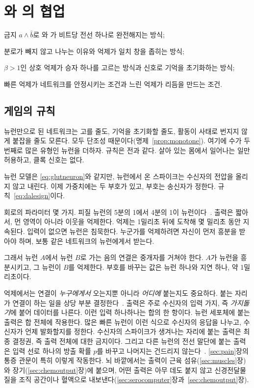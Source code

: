 \chapter{와 의 협업}
\label{sec:gaba}
\begin{chaptergoals}
\item 금지 $a\wedge\bar b$로 와 가 비트당 전선 하나로 완전해지는 방식;
\item 분로가 빼지 않고 나누는 이유와 억제가 일치 창을 좁히는 방식;
\item $\beta>1$인 상호 억제가 승자 하나를 고르는 방식과 신호로 기억을 초기화하는 방식;
\item 빠른 억제가 네트워크를 안정시키는 조건과 느린 억제가 리듬을 만드는 조건.
\end{chaptergoals}

\section{게임의 규칙}

 뉴런만으로 된 네트워크는 고를 줄도, 기억을 초기화할 줄도, 활동이 사태로 번지지 않게 붙잡을 줄도 모른다. 모두 단조성 때문이다(명제~\ref{prop:monotone}). 여기에 수가 두 번째로 많은 유형인  뉴런을 더하자. 규칙은 전과 같다. 살아 있는 몸에서 일어나는 일만 허용하고, 클록 신호는 없다.

뉴런 모델은 \eqref{eq:glutneuron}와 같지만,  뉴런에서 온 스파이크는 수신자의 전압을 올리지 않고 내린다. 이제 가중치에는 두 부호가 있고, 부호는 송신자가 정한다. 규칙~\eqref{eq:dalesign}이다.

회로의 파라미터 몇 가지. 피질 뉴런의 5분의 1에서 4분의 1이  뉴런이다~\cite{Hendry1987}. 출력은 짧아서, 먼 영역이 아니라 이웃을 억제한다. 억제는 1밀리초 뒤에 도착해 몇 밀리초 동안 지속된다. 입력이 없으면  뉴런은 침묵한다. 누군가를 억제하려면 자신이 먼저 흥분을 받아야 하며, 보통 같은 네트워크의  뉴런에게서 받는다.

그래서  뉴런 $A$에서 뉴런 $B$로 가는 음의 연결은 중개자를 거쳐야 한다. $A$가  뉴런을 흥분시키고, 그 뉴런이 $B$를 억제한다. 부호를 바꾸는 값은 뉴런 하나와 지연 하나, 약 1밀리초이다.

억제에서는 연결이 \emph{누구에게서} 오는지뿐 아니라 \emph{어디에} 붙는지도 중요하다. 붙는 자리가 연결이 하는 일을 상당 부분 결정한다~\cite{Markram2004}.  출력은 주로 수신자의 입력 가지, 즉 \emph{가지돌기}에 붙어 데이터를 나른다. 이런 입력 하나하나는 합의 한 항이다. 뉴런 세포체에 붙는 출력은 합 전체에 작용한다. 많은 빠른  뉴런이 이런 식으로 수신자의 응답을 나누고, 수신자가 언제 발화할지를 정한다. 수신자의 스파이크가 생겨나는 자리에 붙는 출력은 최종 결정권, 즉 출력 전체에 대한 금지이다. 그리고 다른 뉴런의 전선 말단에 붙는 출력은 입력 선로 하나의 방출 확률 $p$를 바꾸고 나머지는 건드리지 않는다~\cite{Rudomin1999}. \ref{sec:pain}장의 통증 관문이 특히 이렇게 작동한다. 뇌 바깥에서는 출력이 근육 섬유(\ref{sec:muscles}장)와 장기(\ref{sec:chemoutput}장)에 붙으며, 어떤 출력은 아무 데도 붙지 않고 신경전달물질을 조직 공간이나 혈액으로 내보낸다(\ref{sec:serocomputer}장과~\ref{sec:chemoutput}장).

